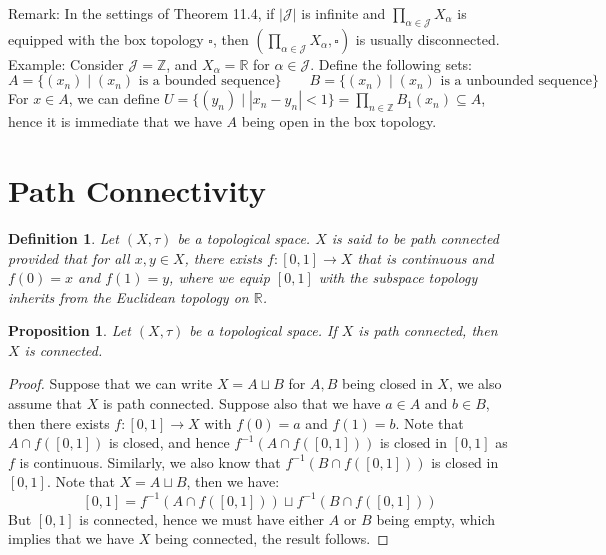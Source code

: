 \documentclass[11pt]{book}
\theoremstyle{break}
\theoremstyle{break}
\newtheorem{prop}[lem]{Proposition}
\newtheorem{defn}{Definition}[corL]
\newcommand{\R}{\mathbb{R}}
\newcommand{\Z}{\mathbb{Z}}
\newcommand{\remark}{\color{blue}Remark: \color{black}}
\newcommand{\example}{\color{green}Example: \color{black}}
\begin{document}
\remark In the settings of Theorem 11.4, if $|\mathcal{J}|$ is infinite and $\prod_{\alpha \in \mathcal{J}}X_\alpha$ is equipped with the box topology $\square$, then $(\prod_{\alpha \in \mathcal{J}}X_\alpha, \square)$ is usually disconnected.\\

\example Consider $\mathcal{J} = \Z$, and $X_\alpha = \R$ for $\alpha \in \mathcal{J}$. Define the following sets: 
$$A = \{(x_n) \mid (x_n) \text{ is a bounded sequence}\} \qquad B = \{(x_n) \mid (x_n) \text{ is a unbounded sequence}\}$$
For $x \in A$, we can define $U = \{(y_n) \mid |x_n - y_n| <1\} = \prod_{n \in \Z}B_1(x_n) \subseteq A$, hence it is immediate that we have $A$ being open in the box topology. 

\newpage
\section[Path Connectivity]{\color{red} Path Connectivity\color{black}}
\begin{defn}
Let $(X,\tau)$ be a topological space. $X$ is said to be path connected provided that for all $x,y\in X$, there exists $f:[0,1] \to X$ that is continuous and $f(0) = x$ and $f(1) = y$, where we equip $[0,1]$ with the subspace topology inherits from the Euclidean topology on $\R$. 
\end{defn}

\begin{prop}
Let $(X,\tau)$ be a topological space. If $X$ is path connected, then  $X$ is connected. 
\end{prop}
\begin{proof}
Suppose that we can write $X = A\sqcup B$ for $A,B$ being closed in $X$, we also assume that $X$ is path connected. Suppose also that we have $a\in A$ and $b \in B$, then there exists $f:[0,1] \to X$ with $f(0) = a$ and $f(1) = b$. Note that $A\cap f([0,1])$ is closed, and hence $f^{-1}(A\cap f([0,1]))$ is closed in $[0,1]$ as $f$ is continuous. Similarly, we also know that $f^{-1}(B \cap f([0,1]))$ is closed in $[0,1]$. Note that $X = A\sqcup B$, then we have:
$$[0,1] = f^{-1}(A\cap f([0,1])) \sqcup f^{-1}(B\cap f([0,1])) $$
But $[0,1]$ is connected, hence we must have either $A$ or $B$ being empty, which implies that we have $ X$ being connected, the result follows.
\end{proof}
\end{document}
